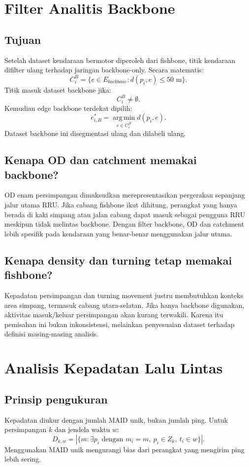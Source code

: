 \documentclass[11pt,a4paper]{article}
\newcommand{\backbone}{\textit{backbone}}
\newcommand{\argmin}{\operatorname*{arg\,min}}
\begin{document}
\section{Filter Analitis Backbone}
\subsection{Tujuan}
Setelah dataset kendaraan bermotor diperoleh dari fishbone, titik kendaraan difilter ulang terhadap jaringan backbone-only. Secara matematis:
\[
C_i^{B}=\{e\in E_{\backbone}: d(p_i,e)\leq50\text{ m}\}.
\]
Titik masuk dataset backbone jika:
\[
C_i^{B}\neq\emptyset.
\]
Kemudian edge backbone terdekat dipilih:
\[
e_{i,B}^{*}=\argmin_{e\in C_i^{B}}d(p_i,e).
\]
Dataset backbone ini disegmentasi ulang dan dilabeli ulang.

\subsection{Kenapa OD dan catchment memakai backbone?}
OD enam persimpangan dimaksudkan merepresentasikan pergerakan sepanjang jalur utama RRU. Jika cabang fishbone ikut dihitung, perangkat yang hanya berada di kaki simpang atau jalan cabang dapat masuk sebagai pengguna RRU meskipun tidak melintas backbone. Dengan filter backbone, OD dan catchment lebih spesifik pada kendaraan yang benar-benar menggunakan jalur utama.

\subsection{Kenapa density dan turning tetap memakai fishbone?}
Kepadatan persimpangan dan turning movement justru membutuhkan konteks area simpang, termasuk cabang utara-selatan. Jika hanya backbone digunakan, aktivitas masuk/keluar persimpangan akan kurang terwakili. Karena itu pemisahan ini bukan inkonsistensi, melainkan penyesuaian dataset terhadap definisi masing-masing analisis.

\section{Analisis Kepadatan Lalu Lintas}
\subsection{Prinsip pengukuran}
Kepadatan diukur dengan jumlah MAID unik, bukan jumlah ping. Untuk persimpangan $k$ dan jendela waktu $w$:
\[
D_{k,w}=\left|\{m:\exists p_i \text{ dengan } m_i=m,\ p_i\in Z_k,\ t_i\in w\}\right|.
\]
Menggunakan MAID unik mengurangi bias dari perangkat yang mengirim ping lebih sering.
\end{document}

